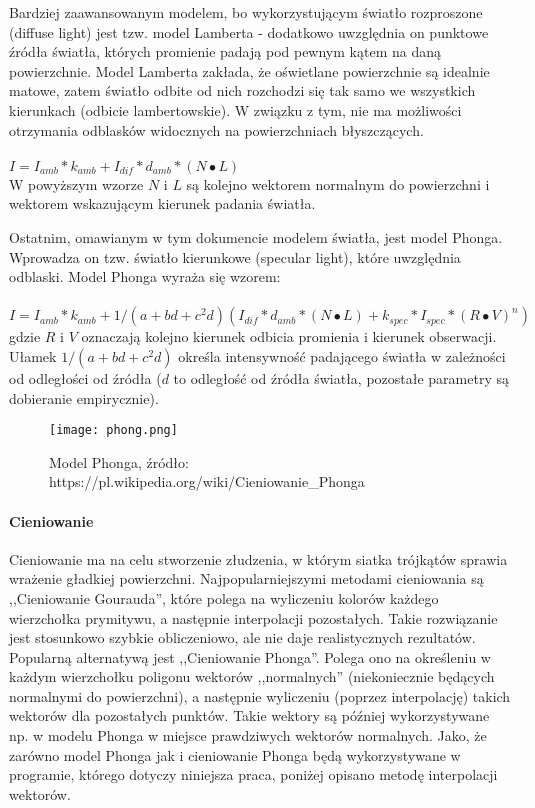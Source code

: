 Bardziej zaawansowanym modelem, bo wykorzystującym światło rozproszone (diffuse light) jest tzw. model Lamberta - dodatkowo uwzględnia on punktowe źródła światła, których promienie padają pod pewnym kątem na daną powierzchnie. Model Lamberta zakłada, że oświetlane powierzchnie są idealnie matowe, zatem światło odbite od nich rozchodzi się tak samo we wszystkich kierunkach (odbicie lambertowskie). W związku z tym, nie ma możliwości otrzymania odblasków widocznych na powierzchniach błyszczących.\\
\\
$I = I_{amb} * k_{amb} + I_{dif} * d_{amb} * (N \bullet L)$
\\
W powyższym wzorze $N$ i $L$ są kolejno wektorem normalnym do powierzchni i wektorem wskazującym kierunek padania światła.


Ostatnim, omawianym w tym dokumencie modelem światła, jest model Phonga. Wprowadza on tzw. światło kierunkowe (specular light), które uwzględnia odblaski. Model Phonga wyraża się wzorem:\\
\\
$I = I_{amb} * k_{amb} + 1/(a + bd + c^2d)(I_{dif} * d_{amb} * (N \bullet L) + k_{spec} * I_{spec} * (R \bullet V)^n)$
\\
gdzie $R$ i $V$ oznaczają kolejno kierunek odbicia promienia i kierunek obserwacji. Ułamek $1/(a + bd + c^2d)$ określa intensywność padającego światła w zależności od odległości od źródła ($d$ to odległość od źródła światła, pozostałe parametry są dobieranie empirycznie).

\begin{figure}[h!]
\centering
  \caption{Model Phonga, źródło: https://pl.wikipedia.org/wiki/Cieniowanie\_Phonga}
  \texttt{[image: phong.png]}
\end{figure}

\paragraph{Cieniowanie}


Cieniowanie ma na celu stworzenie złudzenia, w którym siatka trójkątów sprawia wrażenie gładkiej powierzchni. Najpopularniejszymi metodami cieniowania są ,,Cieniowanie Gourauda'', które polega na wyliczeniu kolorów każdego wierzchołka prymitywu, a następnie interpolacji pozostałych. Takie rozwiązanie jest stosunkowo szybkie obliczeniowo, ale nie daje realistycznych rezultatów. Popularną alternatywą jest ,,Cieniowanie Phonga''. Polega ono na określeniu w każdym wierzchołku poligonu wektorów ,,normalnych'' (niekoniecznie będących normalnymi do powierzchni), a następnie wyliczeniu (poprzez interpolację) takich wektorów dla pozostałych punktów. Takie wektory są później wykorzystywane np. w modelu Phonga w miejsce prawdziwych wektorów normalnych. Jako, że zarówno model Phonga jak i cieniowanie Phonga będą wykorzystywane w programie, którego dotyczy niniejsza praca, poniżej opisano metodę interpolacji wektorów.



